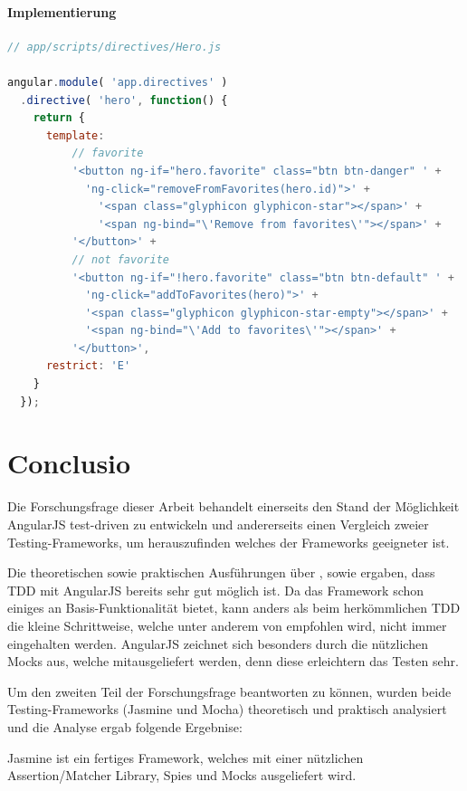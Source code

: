 \paragraph{Implementierung}
\begin{lstlisting}[language=JavaScript, caption=TDD AngularJS - Directives - Implementation]
// app/scripts/directives/Hero.js

angular.module( 'app.directives' )
  .directive( 'hero', function() {
    return {
      template: 
          // favorite
          '<button ng-if="hero.favorite" class="btn btn-danger" ' +
            'ng-click="removeFromFavorites(hero.id)">' +
              '<span class="glyphicon glyphicon-star"></span>' +
              '<span ng-bind="\'Remove from favorites\'"></span>' +
          '</button>' +
          // not favorite
          '<button ng-if="!hero.favorite" class="btn btn-default" ' +
            'ng-click="addToFavorites(hero)">' +
            '<span class="glyphicon glyphicon-star-empty"></span>' +
            '<span ng-bind="\'Add to favorites\'"></span>' +
          '</button>',
      restrict: 'E'
    }
  });

\end{lstlisting}

\newpage
\section{Conclusio}
Die Forschungsfrage dieser Arbeit behandelt einerseits den Stand der Möglichkeit AngularJS test-driven zu entwickeln und andererseits einen Vergleich zweier Testing-Frameworks, um herauszufinden welches der Frameworks geeigneter ist.

Die theoretischen sowie praktischen Ausführungen über ,  sowie  ergaben, dass TDD mit AngularJS bereits sehr gut möglich ist. Da das Framework schon einiges an Basis-Funktionalität bietet, kann anders als beim herkömmlichen TDD die kleine Schrittweise, welche unter anderem von \cite{Beck:2003} empfohlen wird, nicht immer eingehalten werden. AngularJS zeichnet sich besonders durch die nützlichen Mocks aus, welche mitausgeliefert werden, denn diese erleichtern das Testen sehr.

Um den zweiten Teil der Forschungsfrage beantworten zu können, wurden beide Testing-Frameworks (Jasmine und Mocha) theoretisch und praktisch analysiert und die Analyse ergab folgende Ergebnise:

Jasmine ist ein fertiges Framework, welches mit einer nützlichen Assertion/Matcher Library, Spies und Mocks ausgeliefert wird. 

